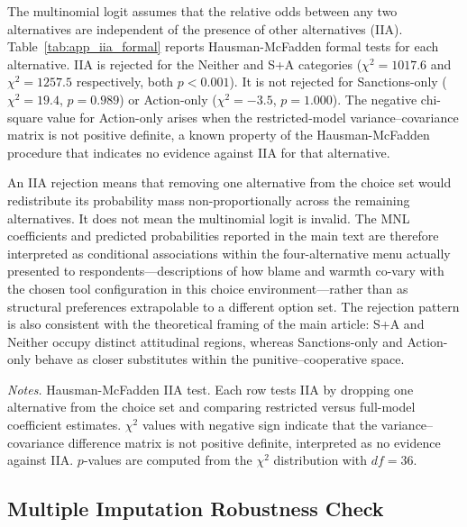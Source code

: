 \documentclass[12pt,letterpaper]{article}
\begin{document}
The multinomial logit assumes that the relative odds between any two alternatives are independent of the presence of other alternatives (IIA). Table~\ref{tab:app_iia_formal} reports Hausman-McFadden formal tests for each alternative. IIA is rejected for the Neither and S+A categories ($\chi^2 = 1017.6$ and $\chi^2 = 1257.5$ respectively, both $p < 0.001$). It is not rejected for Sanctions-only ($\chi^2 = 19.4$, $p = 0.989$) or Action-only ($\chi^2 = -3.5$, $p = 1.000$). The negative chi-square value for Action-only arises when the restricted-model variance--covariance matrix is not positive definite, a known property of the Hausman-McFadden procedure that indicates no evidence against IIA for that alternative.

An IIA rejection means that removing one alternative from the choice set would redistribute its probability mass non-proportionally across the remaining alternatives. It does not mean the multinomial logit is invalid. The MNL coefficients and predicted probabilities reported in the main text are therefore interpreted as conditional associations within the four-alternative menu actually presented to respondents---descriptions of how blame and warmth co-vary with the chosen tool configuration in this choice environment---rather than as structural preferences extrapolable to a different option set. The rejection pattern is also consistent with the theoretical framing of the main article: S+A and Neither occupy distinct attitudinal regions, whereas Sanctions-only and Action-only behave as closer substitutes within the punitive--cooperative space.

\begin{table}[htbp]
\centering
\small
\caption{IIA Formal Tests: Hausman-McFadden Statistic for Each Alternative}
\label{tab:app_iia_formal}

\par\vspace{0.5ex}
{\footnotesize\textit{Notes.} Hausman-McFadden IIA test. Each row tests IIA by dropping one alternative from the choice set and comparing restricted versus full-model coefficient estimates. $\chi^2$ values with negative sign indicate that the variance--covariance difference matrix is not positive definite, interpreted as no evidence against IIA. $p$-values are computed from the $\chi^2$ distribution with $df = 36$.}
\end{table}

\subsection{Multiple Imputation Robustness Check}
\label{sec:app_mi}
\end{document}
